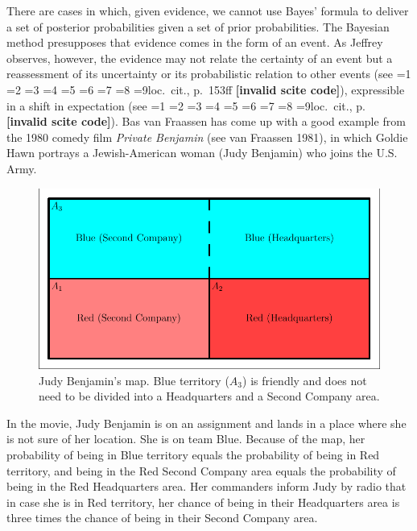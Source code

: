 \documentclass[12pt]{article}
\newcommand{\nonsc}[1]{}
\newif\ifNumericalOrYear
\newcommand{\PageP}{p.~}
\newcommand{\PageP}{}
\newcommand{\nias}{\noindent} %
\newcommand{\scite}[3]{\ifnum#1=1\ifNumericalOrYear\citep{#2}\else\citeyearpar{#2}\fi\else
\ifnum#1=2\ifNumericalOrYear\citep[#3]{#2}\else\citep[{\PageP}#3]{#2}\fi\else
\ifnum#1=3\ifNumericalOrYear(\citet[#3]{#2})\else\citep[{\PageP}#3]{#2}\fi\else
\ifnum#1=4\ifNumericalOrYear\citet{#2}\else\citet{#2}\fi\else
\ifnum#1=5\ifNumericalOrYear(\citet{#2})\else\citep{#2}\fi\else
\ifnum#1=6\ifNumericalOrYear(\citet[#3]{#2})\else\citep[{\PageP}#3]{#2}\fi\else
\ifnum#1=7\ifNumericalOrYear\citep{#2}\else\citealp{#2}\fi\else
\ifnum#1=8\ifNumericalOrYear\citep[#3]{#2}\else\citealp[{\PageP}#3]{#2}\fi\else
\ifnum#1=9\ifNumericalOrYear\citep[#3]{#2}\else{}loc.\ cit., {\PageP}#3\fi\else
\textbf{[invalid scite code]}\fi\fi\fi\fi\fi\fi\fi\fi\fi}
\begin{document}
\nias There are cases in which, given evidence, we cannot use Bayes'
formula to deliver a set of posterior probabilities given a set of
prior probabilities. The Bayesian method presupposes that evidence
comes in the form of an event. As Jeffrey observes, however, the
evidence may not relate the certainty of an event but a reassessment
of its uncertainty or its probabilistic relation to other events (see
\scite{8}{jeffrey65}{153ff}), expressible in a shift in expectation
(see \scite{7}{hobson71}{}). Bas van Fraassen has come up with a good
example from the 1980 comedy film \emph{Private Benjamin} (see van
Fraassen 1981)\nonsc{}, in which Goldie Hawn portrays a Jewish-American woman
(Judy Benjamin) who joins the U.S. Army.

\begin{figure}[h]
  \begin{flushright}
    \begin{minipage}[h]{.8\linewidth}
      \includegraphics[width=\textwidth]{judy.pdf}
      \caption{Judy Benjamin's map. Blue territory ($A_{3}$) is friendly and
        does not need to be divided into a Headquarters and a Second
        Company area.}
      \label{fig:map}
    \end{minipage}
  \end{flushright}
\end{figure}

In the movie, Judy Benjamin is on an assignment and lands in a place
where she is not sure of her location. She is on team Blue. Because of
the map, her probability of being in Blue territory equals the
probability of being in Red territory, and being in the Red Second
Company area equals the probability of being in the Red Headquarters
area. Her commanders inform Judy by radio that in case she is in Red
territory, her chance of being in their Headquarters area is three
times the chance of being in their Second Company area.
\end{document}
